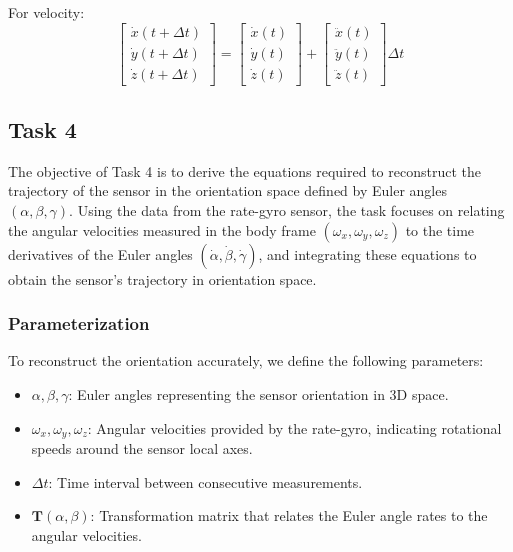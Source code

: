 \documentclass[12pt]{article}
\begin{document}
For velocity:
\[
\begin{bmatrix} \dot{x}(t + \Delta t) \\ \dot{y}(t + \Delta t) \\ \dot{z}(t + \Delta t) \end{bmatrix}
= 
\begin{bmatrix} \dot{x}(t) \\ \dot{y}(t) \\ \dot{z}(t) \end{bmatrix}
+ 
\begin{bmatrix} \ddot{x}(t) \\ \ddot{y}(t) \\ \ddot{z}(t) \end{bmatrix} \Delta t
\]







\subsection{Task 4}

The objective of Task 4 is to derive the equations required to reconstruct the trajectory of the sensor in the orientation space defined by Euler angles \((\alpha, \beta, \gamma)\). Using the data from the rate-gyro sensor, the task focuses on relating the angular velocities measured in the body frame \((\omega_x, \omega_y, \omega_z)\) to the time derivatives of the Euler angles \((\dot{\alpha}, \dot{\beta}, \dot{\gamma})\), and integrating these equations to obtain the sensor's trajectory in orientation space.

\subsubsection{Parameterization}
To reconstruct the orientation accurately, we define the following parameters:
\begin{itemize}
    \item \(\alpha, \beta, \gamma\): Euler angles representing the sensor orientation in 3D space.
    \item \(\omega_x, \omega_y, \omega_z\): Angular velocities provided by the rate-gyro, indicating rotational speeds around the sensor local axes.
    \item \(\Delta t\): Time interval between consecutive measurements.
    \item \(\mathbf{T}(\alpha, \beta)\): Transformation matrix that relates the Euler angle rates to the angular velocities.
\end{itemize}
\end{document}
